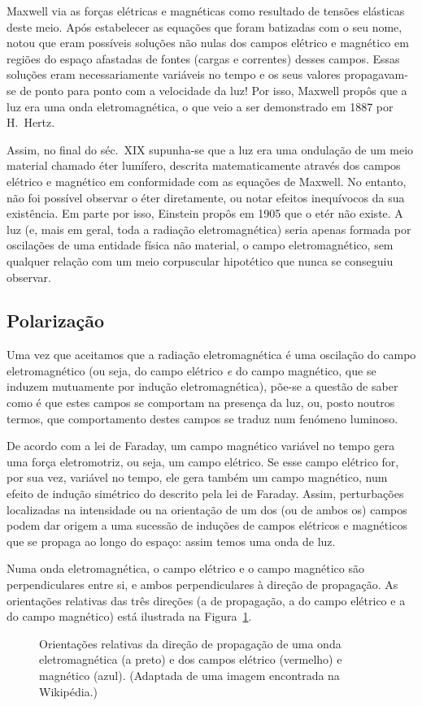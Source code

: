 Maxwell via as forças elétricas e magnéticas como resultado de tensões elásticas
deste meio. Após estabelecer as equações que foram batizadas com o seu nome,
notou que eram possíveis soluções não nulas dos campos elétrico e magnético em
regiões do espaço afastadas de fontes (cargas e correntes) desses campos. Essas
soluções eram necessariamente variáveis no tempo e os seus valores propagavam-se
de ponto para ponto com a velocidade da luz! Por isso, Maxwell propôs que a luz
era uma onda eletromagnética, o que veio a ser demonstrado em 1887 por H.~Hertz.

Assim, no final do séc.~XIX supunha-se que a luz era uma ondulação de um meio
material chamado éter lumífero, descrita matematicamente através dos campos
elétrico e magnético em conformidade com as equações de Maxwell. No entanto, não
foi possível observar o éter diretamente, ou notar efeitos inequívocos da sua
existência. Em parte por isso, Einstein propôs em 1905 que o etér não existe. A
luz (e, mais em geral, toda a radiação eletromagnética) seria apenas formada
por oscilações de uma entidade física não material, o campo eletromagnético, sem
qualquer relação com um meio corpuscular hipotético que nunca se conseguiu
observar.


\subsection{Polarização}
Uma vez que aceitamos que a radiação eletromagnética é uma oscilação do campo
eletromagnético (ou seja, do campo elétrico \emph{e} do campo magnético, que se
induzem mutuamente por indução eletromagnética), põe-se a questão de saber como
é que estes campos se comportam na presença da luz, ou, posto noutros termos,
que comportamento destes campos se traduz num fenómeno luminoso. 

De acordo com a lei de Faraday, um campo magnético variável no tempo gera uma
força eletromotriz, ou seja, um campo elétrico. Se esse campo elétrico for, por
sua vez, variável no tempo, ele gera também um campo magnético, num efeito de
indução simétrico do descrito pela lei de Faraday. Assim, perturbações
localizadas na intensidade ou na orientação de um dos (ou de ambos os) campos
podem dar origem a uma sucessão de induções de campos elétricos e magnéticos que
se propaga ao longo do espaço: assim temos uma onda de luz. 

Numa onda eletromagnética, o campo elétrico e o campo magnético são
perpendiculares entre si, e ambos perpendiculares à direção de propagação. As
orientações relativas das três direções (a de propagação, a do campo elétrico e
a do campo magnético) está ilustrada na Figura~\ref{fig:oof140}.
\begin{figure}[htb]
    {\centering


    }
    \caption{Orientações relativas da direção de propagação de uma onda
        eletromagnética (a preto) e dos campos elétrico (vermelho) e magnético
    (azul). (Adaptada de uma imagem encontrada na Wikipédia.)\label{fig:oof140}}
\end{figure}

